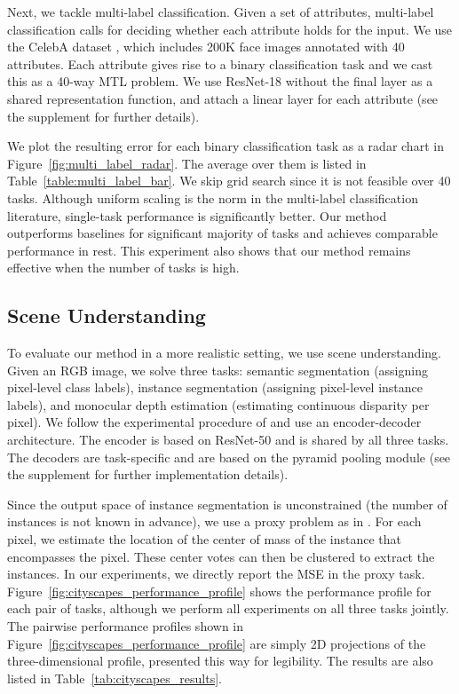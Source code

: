 Next, we tackle multi-label classification. Given a set of attributes, multi-label classification calls for deciding whether each attribute holds for the input. We use the CelebA dataset \citep{celeba}, which includes 200K face images annotated with 40 attributes. Each attribute gives rise to a binary classification task and we cast this as a 40-way MTL problem. We use ResNet-18 \citep{resnet} without the final layer as a shared representation function, and attach a linear layer for each attribute (see the supplement for further details).


We plot the resulting error for each binary classification task as a radar chart in Figure~\ref{fig:multi_label_radar}. The average over them is listed in Table~\ref{table:multi_label_bar}. We skip grid search since it is not feasible over 40 tasks. Although uniform scaling is the norm in the multi-label classification literature, single-task performance is significantly better. Our method outperforms baselines for significant majority of tasks and achieves comparable performance in rest. This experiment also shows that our method remains effective when the number of tasks is high.


\subsection{Scene Understanding}

To evaluate our method in a more realistic setting, we use scene understanding. Given an RGB image, we solve three tasks: semantic segmentation (assigning pixel-level class labels), instance segmentation (assigning pixel-level instance labels), and monocular depth estimation (estimating continuous disparity per pixel). We follow the experimental procedure of \citet{Kendall2018} and use an encoder-decoder architecture. The encoder is based on ResNet-50 \citep{resnet} and is shared by all three tasks. The decoders are task-specific and are based on the pyramid pooling module \citep{pspnet} (see the supplement for further implementation details).

Since the output space of instance segmentation is unconstrained (the number of instances is not known in advance), we use a proxy problem as in \citet{Kendall2018}. For each pixel, we estimate the location of the center of mass of the instance that encompasses the pixel. These center votes can then be clustered to extract the instances. In our experiments, we directly report the MSE in the proxy task. Figure~\ref{fig:cityscapes_performance_profile} shows the performance profile for each pair of tasks, although we perform all experiments on all three tasks jointly. The pairwise performance profiles shown in Figure~\ref{fig:cityscapes_performance_profile} are simply 2D projections of the three-dimensional profile, presented this way for legibility. The results are also listed in Table~\ref{tab:cityscapes_results}.

